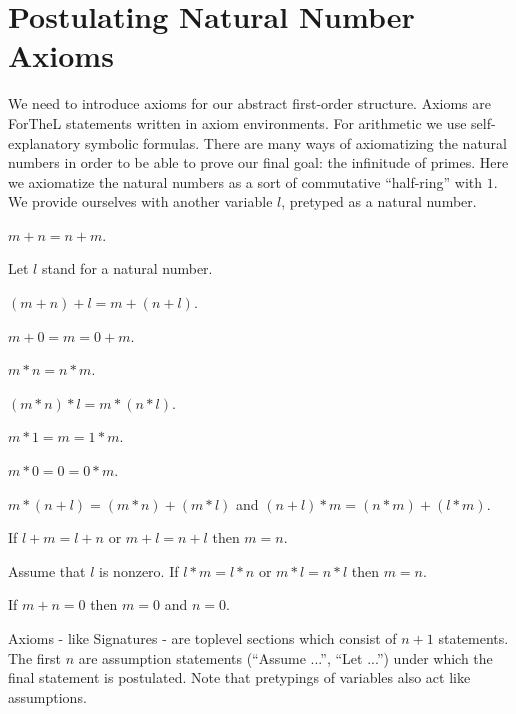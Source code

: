 \documentclass{stex}
\begin{document}
\section{Postulating Natural Number Axioms}

We need to introduce axioms for our abstract first-order structure.
Axioms are ForTheL statements written in axiom environments.
For arithmetic we use self-explanatory symbolic formulas.
There are many ways of axiomatizing the natural numbers in order
to be able to prove our final goal: the infinitude of
primes. Here we axiomatize the natural numbers as
a sort of commutative ``half-ring'' with $1$.
We provide ourselves with another variable $l$,
pretyped as a natural number.

\begin{forthel}
\begin{axiom} $m + n = n + m$.
\end{axiom}

Let $l$ stand for a natural number.

\begin{axiom} $(m + n) + l = m + (n + l)$.
\end{axiom}

\begin{axiom}  $m + 0 = m = 0 + m$.
\end{axiom}

\begin{axiom} $m * n = n * m$.
\end{axiom}

\begin{axiom} $(m * n) * l = m * (n * l)$.
\end{axiom}

\begin{axiom} $m * 1 = m = 1 * m$.
\end{axiom}

\begin{axiom} $m * 0 = 0 = 0 * m$.
\end{axiom}

\begin{axiom} $m * (n + l) = (m * n) + (m * l)$ and
                $(n + l) * m = (n * m) + (l * m)$.
\end{axiom}

\begin{axiom} If $l + m = l + n$ or $m + l = n + l$
then $m = n$.
\end{axiom}

\begin{axiom} Assume that $l$ is nonzero.
If $l * m = l * n$ or $m * l = n * l$ then $m = n$.
\end{axiom}

\begin{axiom} If $m + n = 0$ then $m = 0$ and $n = 0$.
\end{axiom}

\end{forthel}

Axioms - like Signatures - are toplevel sections which consist of
$n + 1$ statements. The first $n$ are assumption statements
(``Assume ...'', ``Let ...'')
under which the final statement is postulated. Note that
pretypings of variables also act like assumptions.
\end{document}

